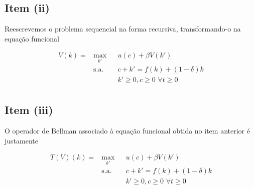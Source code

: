 \documentclass{article}
\begin{document}
\subsection*{Item (ii)}

Reescrevemos o problema sequencial na forma recursiva, transformando-o na equação funcional

\begin{equation}
\begin{aligned}
V(k) = & \max_{k'} & & u(c) + \beta V(k') \\
& \text{s.a.} & &  c + k' = f(k) + (1-\delta) k \\
& & &  k' \geq 0, c \geq 0 \,\, \forall t \geq 0  \\
\end{aligned}
\end{equation}

\subsection*{Item (iii)}

O operador de Bellman associado à equação funcional obtida no item anterior é justamente

\begin{equation}
\begin{aligned}
T(V)(k) = & \max_{k'} & & u(c) + \beta V(k') \\
& \text{s.a.} & &  c + k' = f(k) + (1-\delta) k \\
& & &  k' \geq 0, c \geq 0 \,\, \forall t \geq 0  \\
\end{aligned}
\end{equation}
\end{document}
